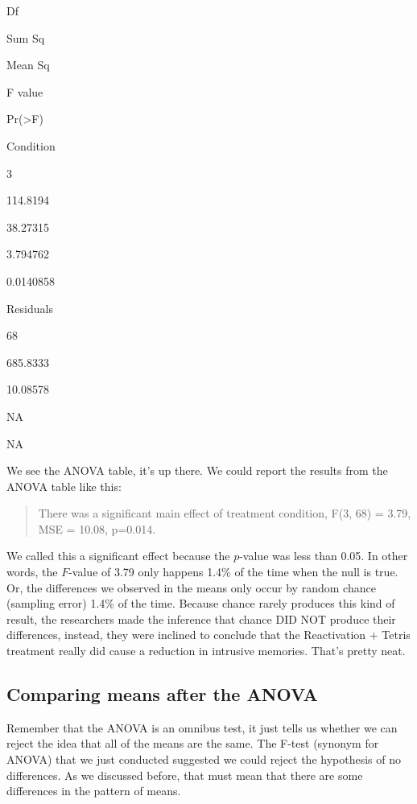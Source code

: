 \documentclass[
]{book}
\begin{document}
Df

Sum Sq

Mean Sq

F value

Pr(\textgreater F)

Condition

3

114.8194

38.27315

3.794762

0.0140858

Residuals

68

685.8333

10.08578

NA

NA

We see the ANOVA table, it's up there. We could report the results from the ANOVA table like this:

\begin{quote}
There was a significant main effect of treatment condition, F(3, 68) = 3.79, MSE = 10.08, p=0.014.
\end{quote}

We called this a significant effect because the \(p\)-value was less than 0.05. In other words, the \(F\)-value of 3.79 only happens 1.4\% of the time when the null is true. Or, the differences we observed in the means only occur by random chance (sampling error) 1.4\% of the time. Because chance rarely produces this kind of result, the researchers made the inference that chance DID NOT produce their differences, instead, they were inclined to conclude that the Reactivation + Tetris treatment really did cause a reduction in intrusive memories. That's pretty neat.

\hypertarget{comparing-means-after-the-anova}{%
\subsection{Comparing means after the ANOVA}\label{comparing-means-after-the-anova}}

Remember that the ANOVA is an omnibus test, it just tells us whether we can reject the idea that all of the means are the same. The F-test (synonym for ANOVA) that we just conducted suggested we could reject the hypothesis of no differences. As we discussed before, that must mean that there are some differences in the pattern of means.
\end{document}
